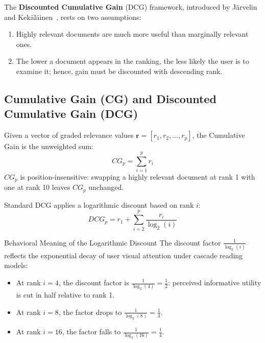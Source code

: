 The \textbf{Discounted Cumulative Gain} (DCG) framework, introduced by J\"arvelin and Kek\"al\"ainen~\cite{jarvelin2002}, rests on two assumptions:
\begin{enumerate}
    \item Highly relevant documents are much more useful than marginally relevant ones.
    \item The lower a document appears in the ranking, the less likely the user is to examine it; hence, gain must be discounted with descending rank.
\end{enumerate}

\subsection{Cumulative Gain (CG) and Discounted Cumulative Gain (DCG)}
\begin{definition}
Given a vector of graded relevance values $\mathbf{r} = [r_1, r_2, \dots, r_p]$, the Cumulative Gain is the unweighted sum:
\begin{equation}
CG_p = \sum_{i=1}^p r_i
\end{equation}
$CG_p$ is position-insensitive: swapping a highly relevant document at rank 1 with one at rank 10 leaves $CG_p$ unchanged.
\end{definition}

\begin{definition}
Standard DCG applies a logarithmic discount based on rank $i$:
\begin{equation}
DCG_p = r_1 + \sum_{i=2}^p \frac{r_i}{\log_2(i)}
\label{eq:dcg-standard-en}
\end{equation}
\end{definition}

\begin{alertblock}{Behavioral Meaning of the Logarithmic Discount}
The discount factor $\frac{1}{\log_2(i)}$ reflects the exponential decay of user visual attention under cascade reading models:
\begin{itemize}
    \item At rank $i = 4$, the discount factor is $\frac{1}{\log_2(4)} = \frac{1}{2}$: perceived informative utility is cut in half relative to rank 1.
    \item At rank $i = 8$, the factor drops to $\frac{1}{\log_2(8)} = \frac{1}{3}$.
    \item At rank $i = 16$, the factor falls to $\frac{1}{\log_2(16)} = \frac{1}{4}$.
\end{itemize}
\end{alertblock}

